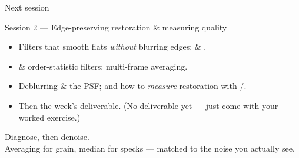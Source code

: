 \documentclass[10pt,aspectratio=169]{beamer}
\begin{document}
\begin{frame}{Next session}
  \begin{alertblock}{Session 2 — Edge-preserving restoration \& measuring quality}
    \begin{itemize}
      \item Filters that smooth flats \emph{without} blurring edges:  \& .
      \item {} \& order-statistic filters;  multi-frame averaging.
      \item Deblurring \& the PSF; and how to \emph{measure} restoration with /.
      \item Then the week's deliverable. (No deliverable yet — just come with your worked exercise.)
    \end{itemize}
  \end{alertblock}
\end{frame}

\begin{frame}[standout]
  Diagnose, then denoise.\\[4pt]
  \normalsize Averaging for grain, median for specks — matched to the noise you actually see.
\end{frame}
\end{document}
